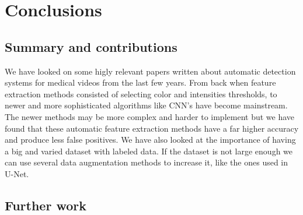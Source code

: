\documentclass[thesis.tex]{subfiles}
\begin{document}
\chapter{Conclusions} \label{conclusions}


\section{Summary and contributions} \label{summaryandcontributions}
We have looked on some higly relevant papers written about automatic detection systems for medical videos from the last few years. From back when feature extraction methods consisted of selecting color and intensities thresholds, to newer and more sophisticated algorithms like CNN's have become mainstream. The newer methods may be more complex and harder to implement but we have found that these automatic feature extraction methods have a far higher accuracy and produce less false positives. We have also looked at the importance of having a big and varied dataset with labeled data. If the dataset is not large enough we can use several data augmentation methods to increase it, like the ones used in U-Net. 


\section{Further work} \label{further_work}
\end{document}
